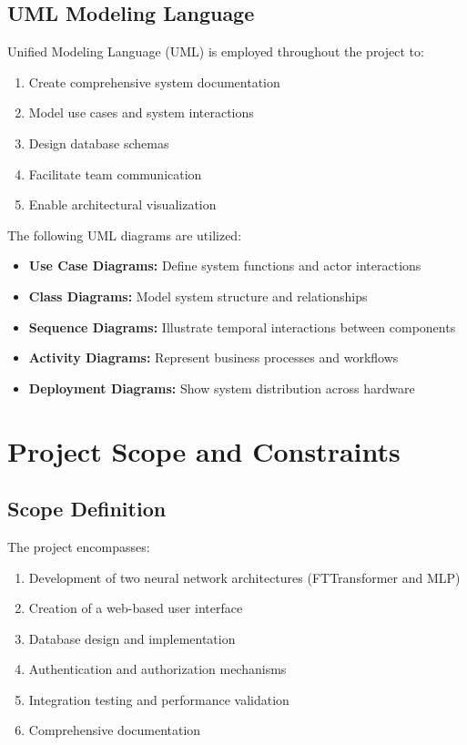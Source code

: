 \documentclass[12pt,a4paper,twoside]{report}
\begin{document}
\subsection{UML Modeling Language}

Unified Modeling Language (UML) is employed throughout the project to:

\begin{enumerate}
    \item Create comprehensive system documentation
    \item Model use cases and system interactions
    \item Design database schemas
    \item Facilitate team communication
    \item Enable architectural visualization
\end{enumerate}

The following UML diagrams are utilized:

\begin{itemize}
    \item \textbf{Use Case Diagrams:} Define system functions and actor interactions
    \item \textbf{Class Diagrams:} Model system structure and relationships
    \item \textbf{Sequence Diagrams:} Illustrate temporal interactions between components
    \item \textbf{Activity Diagrams:} Represent business processes and workflows
    \item \textbf{Deployment Diagrams:} Show system distribution across hardware
\end{itemize}

\section{Project Scope and Constraints}

\subsection{Scope Definition}

The project encompasses:

\begin{enumerate}
    \item Development of two neural network architectures (FTTransformer and MLP)
    \item Creation of a web-based user interface
    \item Database design and implementation
    \item Authentication and authorization mechanisms
    \item Integration testing and performance validation
    \item Comprehensive documentation
\end{enumerate}
\end{document}

